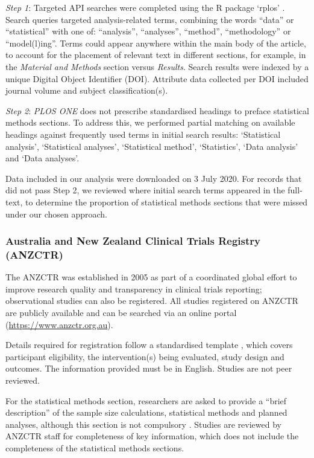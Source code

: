 \documentclass[12pt]{article}
\begin{document}
\emph{Step 1}: Targeted API searches were completed using the R package
`rplos' \citep{rplos}. Search queries targeted analysis-related terms,
combining the words ``data'' or ``statistical'' with one of:
``analysis'', ``analyses'', ``method'', ``methodology'' or
``model(l)ing''. Terms could appear anywhere within the main body of the
article, to account for the placement of relevant text in different
sections, for example, in the \emph{Material and Methods} section versus
\emph{Results}. Search results were indexed by a unique Digital Object
Identifier (DOI). Attribute data collected per DOI included journal
volume and subject classification(s).

\emph{Step 2}: \emph{PLOS ONE} does not prescribe standardised headings
to preface statistical methods sections. To address this, we performed
partial matching on available headings against frequently used terms in
initial search results: `Statistical analysis', `Statistical analyses',
`Statistical method', `Statistics', `Data analysis' and `Data analyses'.

Data included in our analysis were downloaded on 3 July 2020. For
records that did not pass Step 2, we reviewed where initial search terms
appeared in the full-text, to determine the proportion of
statistical methods sections that were missed under our chosen approach.

\subsubsection{Australia and New Zealand Clinical Trials Registry (ANZCTR)}
\label{sec:methodsANZCTR}

The ANZCTR was established in 2005 as part of a coordinated global
effort to improve research quality and transparency in clinical trials
reporting; observational studies can also be registered. All studies
registered on ANZCTR are publicly available and can be searched via an
online portal (\url{https://www.anzctr.org.au}).

Details required for registration follow a standardised template
\citep{ANZCTR}, which covers participant eligibility, the
intervention(s) being evaluated, study design and outcomes. The
information provided must be in English. Studies are not peer reviewed.

For the statistical methods section, researchers are asked to provide a
``brief description'' of the sample size calculations, statistical
methods and planned analyses, although this section is not compulsory
\citep{ANZCTR}. Studies are reviewed by ANZCTR staff for completeness of
key information, which does not include the completeness of the
statistical methods sections.
\end{document}
